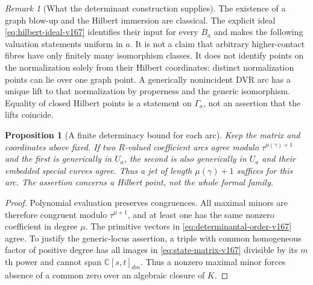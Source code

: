 \documentclass[11pt,reqno]{amsart}
\numberwithin{equation}{section}
\newtheorem{proposition}[theorem]{Proposition}
\theoremstyle{definition}\newtheorem{definition}[theorem]{Definition}
\theoremstyle{remark}\newtheorem{remark}[theorem]{Remark}
\newcommand{\C}{\mathbb C}\newcommand{\Q}{\mathbb Q}
\begin{document}
\begin{remark}[What the determinant construction supplies]
\label{rem:scope-states-v167}
The existence of a graph blow-up and the Hilbert immersion are
classical. The explicit ideal \eqref{eq:hilbert-ideal-v167} identifies
their input for every $B_a$ and makes the following valuation
statements uniform in $a$. It is not a claim that arbitrary
higher-contact fibres have only finitely many isomorphism classes.
It does not identify points on the normalization solely from their
Hilbert coordinates: distinct normalization points can lie over
one graph point. A generically nonincident DVR arc has a unique
lift to that normalization by properness and the generic
isomorphism. Equality of closed Hilbert points is a statement on
$\Gamma_a$, not an assertion that the lifts coincide.
\end{remark}

\begin{proposition}[A finite determinacy bound for each arc]
\label{prop:jet-v167}
Keep the matrix and coordinates above fixed. If two $R$-valued
coefficient arcs agree modulo $\tau^{\mu(\gamma)+1}$ and the first
is generically in $U_a$, the second is also generically in $U_a$
and their embedded special curves agree. Thus a jet of length
$\mu(\gamma)+1$ suffices for this arc. The assertion concerns a
Hilbert point, not the whole formal family.
\end{proposition}
\begin{proof}
Polynomial evaluation preserves congruences. All maximal minors
are therefore congruent modulo $\tau^{\mu+1}$, and at least one
has the same nonzero coefficient in degree $\mu$. The primitive
vectors in \eqref{eq:determinantal-order-v167} agree. To justify
the generic-locus assertion, a triple with common homogeneous
factor of positive degree has all images in
\eqref{eq:state-matrix-v167} divisible by its $m$th power and
cannot span $\C[s,t]_{dm}$. Thus a nonzero maximal minor forces
absence of a common zero over an algebraic closure of $K$.
\end{proof}
\end{document}
